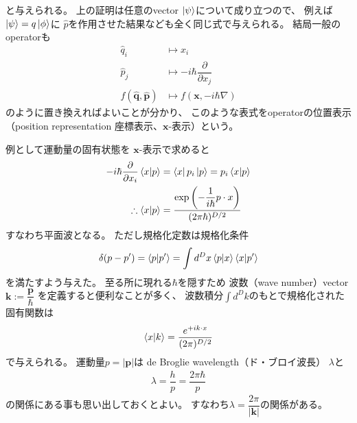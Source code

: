 と与えられる。
上の証明は任意のvector
$\ket{\psi}$について成り立つので、
例えば$\ket{\psi} = q \ket{\phi}$に
$\hat{p}$を作用させた結果なども全く同じ式で与えられる。
結局一般のoperatorも
\begin{subequations}
\begin{align}
    \hat{q}_i
    &\mapsto
    x_i
\\
    \hat{p}_j
    &\mapsto
    - i \hbar
    \dfrac{\partial}{\partial x_j}
\\
    f( \hat{\bm{q}}, \hat{\bm{p}} )
    &\mapsto
    f
    \left( \bm{x}, 
        - i \hbar
        \nabla
    \right)
\end{align}
\label{position representation of operators}
\end{subequations}
のように置き換えればよいことが分かり、
このような表式をoperatorの位置表示
（position representation
座標表示、$\bm{x}$-表示）という。

例として運動量の固有状態を
$\bm{x}$-表示で求めると
\begin{align}
    - i \hbar
    \dfrac{\partial}{\partial x_i}
    \braket{ x | p }
    &=
    \bra{ x }
    p_i
    \ket{ p }
    =
    p_i
    \braket{ x | p }
\notag\\\therefore
    \braket{ x | p }
    &=
    \dfrac{
        \exp\left(
            -
            \dfrac{1}{i\hbar}
            p \cdot x
        \right)
    }{ (2 \pi \hbar)^{D/2} }
\label{plain wave in qm}
\end{align}
すなわち平面波となる。
ただし規格化定数は規格化条件
\begin{align}
    \delta( p - p' )
    =
    \braket{ p | p' }
    =
    \int d^D x
    \braket{ p | x }
    \braket{ x | p' }
\end{align}
を満たすよう与えた。
至る所に現れる$\hbar$を隠すため
波数（wave number）vector
$\bm{k} := \dfrac{ \bm{p} }{\hbar}$
を定義すると便利なことが多く、
波数積分$\int d^D k$のもとで規格化された
固有関数は
\begin{align}
    \braket{x | k}
    =
    \dfrac{
        e^{
            + i
            k \cdot x
        }
    }{ (2 \pi)^{D/2} }
\end{align}
で与えられる。
運動量$p = |\bm{p}|$は
de Broglie wavelength（ド・ブロイ波長）
$\lambda$と
\begin{align}
    \lambda = \dfrac{h}{p}
    = \dfrac{2 \pi \hbar}{p}
\end{align}
の関係にある事も思い出しておくとよい。
すなわち$\lambda = \dfrac{2 \pi}{|\bm{k}|}$の関係がある。

